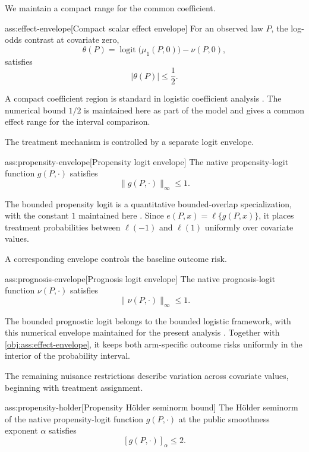 We maintain a compact range for the common coefficient.

\begin{assumptionv}{ass:effect-envelope}[Compact scalar effect envelope]
For an observed law \(P\), the log-odds contrast at covariate zero,
\[
\theta(P)=\operatorname{logit}\bigl(\mu_1(P,0)\bigr)-\nu(P,0),
\]
satisfies
\[
|\theta(P)|\le \frac12.
\]
\end{assumptionv}

A compact coefficient region is standard in logistic coefficient analysis \citep{LiuZhangZhou2020LogisticDML}. The numerical bound \(1/2\) is maintained here as part of the model and gives a common effect range for the interval comparison.

The treatment mechanism is controlled by a separate logit envelope.

\begin{assumptionv}{ass:propensity-envelope}[Propensity logit envelope]
The native propensity-logit function \(g(P,\cdot)\) satisfies
\[
\|g(P,\cdot)\|_\infty\le 1.
\]
\end{assumptionv}

The bounded propensity logit is a quantitative bounded-overlap specialization, with the constant \(1\) maintained here \citep{RobinsTchetgenLiVanderVaart2009Minimax}. Since \(e(P,x)=\ell\{g(P,x)\}\), it places treatment probabilities between \(\ell(-1)\) and \(\ell(1)\) uniformly over covariate values.

A corresponding envelope controls the baseline outcome risk.

\begin{assumptionv}{ass:prognosis-envelope}[Prognosis logit envelope]
The native prognosis-logit function \(\nu(P,\cdot)\) satisfies
\[
\|\nu(P,\cdot)\|_\infty\le 1.
\]
\end{assumptionv}

The bounded prognostic logit belongs to the bounded logistic framework, with this numerical envelope maintained for the present analysis \citep{LiuZhangZhou2020LogisticDML}. Together with \cref{obj:ass:effect-envelope}, it keeps both arm-specific outcome risks uniformly in the interior of the probability interval.

The remaining nuisance restrictions describe variation across covariate values, beginning with treatment assignment.

\begin{assumptionv}{ass:propensity-holder}[Propensity Hölder seminorm bound]
The Hölder seminorm of the native propensity-logit function \(g(P,\cdot)\) at the public smoothness exponent \(\alpha\) satisfies
\[
[g(P,\cdot)]_\alpha\le 2.
\]
\end{assumptionv}

